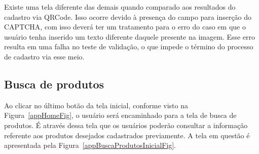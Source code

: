 Existe uma tela diferente das demais quando comparado aos resultados do cadastro via QRCode. Isso ocorre devido à presença do campo para inserção do CAPTCHA, com isso deverá ter um tratamento para o erro do caso em que o usuário tenha inserido um texto diferente daquele presente na imagem. Esse erro resulta em uma falha no teste de validação, o que impede o término do processo de cadastro via esse meio.

\subsection{Busca de produtos}

Ao clicar no último botão da tela inicial, conforme visto na Figura~\ref{appHomeFig}, o usuário será encaminhado para a tela de busca de produtos. É através dessa tela que os usuários poderão consultar a informação referente aos produtos desejados cadastrados previamente. A tela em questão é apresentada pela Figura~\ref{appBuscaProdutosInicialFig}.

